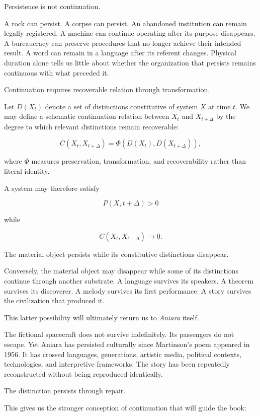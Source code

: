 \documentclass[11pt,oneside]{book}
\theoremstyle{definition}
\theoremstyle{remark}
\begin{document}
Persistence is not continuation.

A rock can persist. A corpse can persist. An abandoned institution can remain legally registered. A machine can continue operating after its purpose disappears. A bureaucracy can preserve procedures that no longer achieve their intended result. A word can remain in a language after its referent changes. Physical duration alone tells us little about whether the organization that persists remains continuous with what preceded it.

Continuation requires recoverable relation through transformation.

Let \(D(X_t)\) denote a set of distinctions constitutive of system \(X\) at time \(t\). We may define a schematic continuation relation between \(X_t\) and \(X_{t+\Delta}\) by the degree to which relevant distinctions remain recoverable:

\[
C(X_t,X_{t+\Delta})
=
\Phi\!\left(
D(X_t),
D(X_{t+\Delta})
\right),
\]

where \(\Phi\) measures preservation, transformation, and recoverability rather than literal identity.

A system may therefore satisfy

\[
P(X,t+\Delta)>0
\]

while

\[
C(X_t,X_{t+\Delta})\rightarrow0.
\]

The material object persists while its constitutive distinctions disappear.

Conversely, the material object may disappear while some of its distinctions continue through another substrate. A language survives its speakers. A theorem survives its discoverer. A melody survives its first performance. A story survives the civilization that produced it.

This latter possibility will ultimately return us to \emph{Aniara} itself.

The fictional spacecraft does not survive indefinitely. Its passengers do not escape. Yet Aniara has persisted culturally since Martinson's poem appeared in 1956. It has crossed languages, generations, artistic media, political contexts, technologies, and interpretive frameworks. The story has been repeatedly reconstructed without being reproduced identically.

The distinction persists through repair.

This gives us the stronger conception of continuation that will guide the book:
\end{document}
